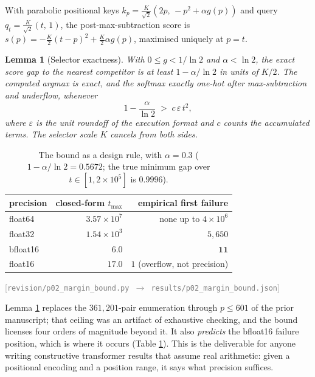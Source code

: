 \documentclass[11pt]{article}
\newtheorem{lemma}{Lemma}
\newcommand{\src}[1]{{\footnotesize\textcolor{gray}{[\texttt{#1}]}}}
\begin{document}
With parabolic positional keys $k_p = \tfrac{K}{\sqrt2}(2p,\, -p^2 + \alpha g(p))$
and query $q_t = \tfrac{K}{\sqrt2}(t,\,1)$, the post-max-subtraction score is
$s(p) = -\tfrac{K}{2}(t-p)^2 + \tfrac{K}{2}\alpha g(p)$, maximised uniquely at
$p=t$.

\begin{lemma}[Selector exactness]\label{lem:margin}
With $0 \le g < 1/\ln 2$ and $\alpha < \ln 2$, the exact score gap to the nearest
competitor is at least $1 - \alpha/\ln 2$ in units of $K/2$. The computed argmax
is exact, and the softmax exactly one-hot after max-subtraction and underflow,
whenever
\[
1 - \frac{\alpha}{\ln 2} \;>\; c\,\varepsilon\,t^{2},
\]
where $\varepsilon$ is the unit roundoff of the execution format and $c$ counts
the accumulated terms. The selector scale $K$ cancels from both sides.
\end{lemma}

\begin{table}[t]
\centering
\caption{The bound as a design rule, with $\alpha = 0.3$
($1-\alpha/\ln 2 = 0.5672$; the true minimum gap over $t\in[1,2\times10^5]$ is
$0.9996$).}
\label{tab:margin}
\small
\begin{tabular}{lrr}
\toprule
precision & closed-form $t_{\max}$ & empirical first failure \\
\midrule
float64  & $3.57\times10^{7}$ & none up to $4\times10^{6}$ \\
float32  & $1.54\times10^{3}$ & $5{,}650$ \\
bfloat16 & $6.0$              & $\mathbf{11}$ \\
float16  & $17.0$             & $1$ (overflow, not precision) \\
\bottomrule
\end{tabular}
\src{revision/p02\_margin\_bound.py $\to$ results/p02\_margin\_bound.json}
\end{table}

Lemma \ref{lem:margin} replaces the $361{,}201$-pair enumeration through
$p \le 601$ of the prior manuscript; that ceiling was an artifact of exhaustive
checking, and the bound licenses four orders of magnitude beyond it. It also
\emph{predicts} the bfloat16 failure position, which is where it occurs
(Table \ref{tab:margin}). This is the deliverable for anyone writing constructive
transformer results that assume real arithmetic: given a positional encoding and
a position range, it says what precision suffices.
\end{document}
